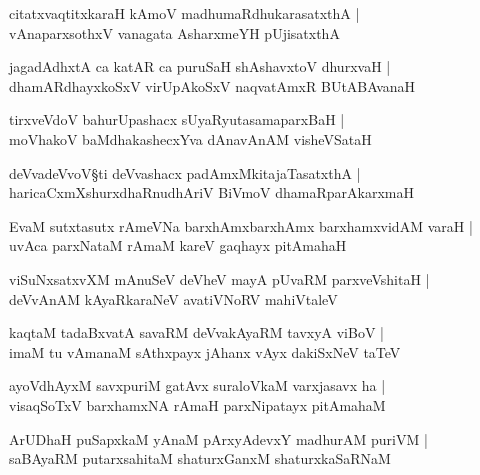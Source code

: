 \begin{shloka}
citatxvaqtitxkaraH kAmoV madhumaRdhukarasatxthA |\\
vAnaparxsothxV vanagata AsharxmeYH pUjisatxthA 
\end{shloka}

\begin{shloka}
jagadAdhxtA ca katAR ca puruSaH shAshavxtoV dhurxvaH |\\
dhamARdhayxkoSxV virUpAkoSxV naqvatAmxR BUtABAvanaH 
\end{shloka}

\begin{shloka}
tirxveVdoV bahurUpashacx sUyaRyutasamaparxBaH |\\
moVhakoV baMdhakashecxYva dAnavAnAM visheVSataH 
\end{shloka}

\begin{shloka}
deVvadeVvoV\S ti deVvashacx padAmxMkitajaTasatxthA |\\
haricaCxmXshurxdhaRnudhAriV BiVmoV dhamaRparAkarxmaH
\end{shloka}

\begin{shloka}
EvaM sutxtasutx rAmeVNa barxhAmxbarxhAmx barxhamxvidAM varaH |\\
uvAca parxNataM rAmaM kareV gaqhayx pitAmahaH 
\end{shloka}

\begin{shloka}
viSuNxsatxvXM mAnuSeV deVheV mayA pUvaRM parxveVshitaH |\\
deVvAnAM kAyaRkaraNeV avatiVNoRV mahiVtaleV 
\end{shloka}

\begin{shloka}
kaqtaM tadaBxvatA savaRM deVvakAyaRM tavxyA viBoV |\\
imaM tu vAmanaM sAthxpayx jAhanx vAyx dakiSxNeV taTeV
\end{shloka}

\begin{shloka}
ayoVdhAyxM savxpuriM gatAvx suraloVkaM varxjasavx ha |\\
visaqSoTxV barxhamxNA rAmaH parxNipatayx pitAmahaM 
\end{shloka}

\begin{shloka}
ArUDhaH puSapxkaM yAnaM pArxyAdevxY madhurAM puriVM |\\
saBAyaRM putarxsahitaM shaturxGanxM shaturxkaSaRNaM 
\end{shloka}

